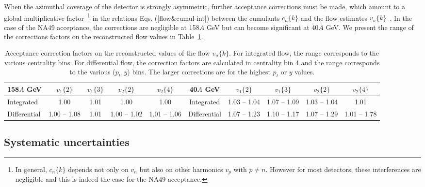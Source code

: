 \documentclass[aps,prc,superscriptaddress,showpacs,floatfix,nofootinbib]{revtex4}
\begin{document}
When the azimuthal coverage of the detector is strongly asymmetric,
further acceptance corrections must be made, which amount to a global
multiplicative factor~\footnote{In general, $c_n\{k\}$ depends not
only on $v_n$ but also on other harmonics $v_p$ with $p\neq
n$. However for most detectors, these interferences are negligible and
this is indeed the case for the NA49 acceptance.} in the relations
Eqs. (\ref{flow&cumul-int}) between the cumulants $c_n\{k\}$ and the
flow estimates $v_n\{k\}$~\cite{Borghini:2001vi,Borghini:2002vp}.  In
the case of the NA49 acceptance, the corrections are negligible at
158$A$ GeV but can become significant at 40$A$ GeV.  We present the
range of the corrections factors on the reconstructed flow values in
Table~\ref{tbl:cum&acc}.
\begin{table}[hbt!]
\caption { Acceptance correction factors
  on the reconstructed values of the flow $v_n\{k\}$.  For integrated
  flow, the range corresponds to the various centrality bins.  For
  differential flow, the correction factors are calculated in
  centrality bin 4 and the range corresponds to the various ($p_t,y$)
  bins. The larger corrections are for the highest $p_t$ or $y$
  values.}
\begin{center}
\begin{ruledtabular}
\begin{tabular}{l|c|c|c|c||c|c|c|c|c}
158$A$ GeV & $v_1\{2\}$ & $v_1\{3\}$ & $v_2\{2\}$ & $v_2\{4\}$ &
40$A$ GeV & $v_1\{2\}$ & $v_1\{3\}$ & $v_2\{2\}$ & $v_2\{4\}$ \\
\hline 
Integrated & 1.00 & 1.01 & 1.00 & 1.00 & 
Integrated & 1.03 -- 1.04 & 1.07 -- 1.09 & 1.03 -- 1.04 & 1.01
\\ \hline 
Differential & 1.00 -- 1.08 & 1.01 & 1.00 -- 1.02 & 1.01 --
1.06 & 
Differential & 1.07 -- 1.23 & 1.10 -- 1.17 & 1.07 -- 1.29 & 1.01 --
1.78 \\ 
\end{tabular}
\end{ruledtabular}
\end{center}
\label{tbl:cum&acc}
\end{table}



\subsection{Systematic uncertainties}
\label{s:sys}
\end{document}
